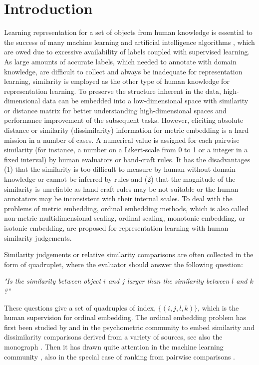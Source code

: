 \documentclass[letterpaper]{article}
\begin{document}
		\section{Introduction}
		Learning representation for a set of objects from human knowledge is essential to the success of many machine learning and artificial intelligence algorithms \cite{6472238}, which are owed due to excessive availability of labels coupled with supervised learning. As large amounts of accurate labels, which needed to annotate with domain knowledge, are difficult to collect and always be inadequate for representation learning, similarity is employed as the other type of human knowledge for representation learning. To preserve the structure inherent in the data, high-dimensional data can be embedded into a low-dimensional space \cite{Indyk:2001:AAL:874063.875596,Indyk04low-distortionembeddings} with similarity or distance matrix for better understanding high-dimensional spaces and performance improvement of the subsequent tasks. However, eliciting absolute distance or similarity (dissimilarity) information for metric embedding is a hard mission in a number of cases. A numerical value is assigned for each pairwise similarity (for instance, a number on a Likert-scale from 0 to 1 or a integer in a fixed interval) by human evaluators or hand-craft rules. It has the disadvantages (1) that the similarity is too difficult to measure by human without domain knowledge or cannot be inferred by rules and (2) that the magnitude of the similarity is unreliable as hand-craft rules may be not suitable or the human annotators may be inconsistent with their internal scales. To deal with the problems of metric embedding, ordinal embedding methods, which is also called non-metric multidimensional scaling, ordinal scaling, monotonic embedding, or isotonic embedding, are proposed for representation learning with human similarity judgements.

		Similarity judgements or relative similarity comparisons are often collected in the form of quadruplet, where the evaluator should answer the following question:

		\emph{"Is the similarity between object $i$ and $j$ larger than the similarity between $l$ and $k$?"}

		These questions give a set of quadruples of index, $\{(i,j,l,k)\}$, which is the human supervision for ordinal embedding. The ordinal embedding problem has first been studied by \cite{Shepard1962a,Shepard1962b} and \cite{Kruskal1964a,Kruskal1964b} in the psychometric community to embed similarity and dissimilarity comparisons derived from a variety of sources, see also the monograph \cite{Borg05}. Then it has drawn quite attention in the machine learning community \cite{Quist2004DistributionalSA,RosalesSparselinear,agarwal2007generalized,ShawstructPE,McFee:2009:POE:1553374.1553467,jamieson2011low,McFee:2011:LMS:1953048.1953063,tamuz2011adaptiive,vandermaaten2012stochastic,Ailon:2012:ALA:2188385.2188390,Terada2014LocalOE,amid2015multiview,2016arXiv160607081J}, also in the special case of ranking from pairwise comparisons \cite{ouyang2008learning,Mcfee10metriclearning,kevin2011active,NIPS2012_0599,wauthier2013efficient}.
\end{document}
